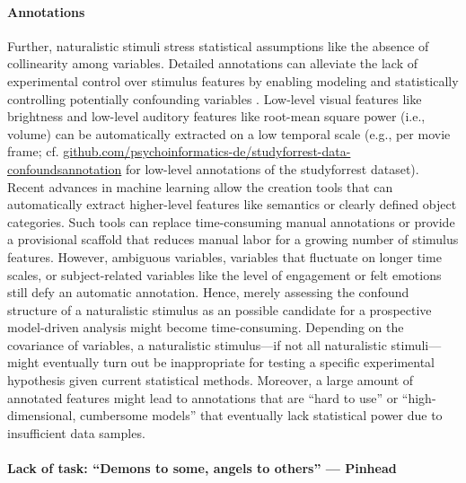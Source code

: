 \paragraph{Annotations}
%
Further, naturalistic stimuli stress statistical assumptions like the absence of
collinearity among variables.
%
Detailed annotations can alleviate the lack of experimental control over
stimulus features by enabling modeling and statistically controlling potentially
confounding variables \citep[e.g.,][]{deniz2019representation}.
%
Low-level visual features like brightness and
low-level auditory features like root-mean square power (i.e., volume) can be
automatically extracted on a low temporal scale (e.g., per movie frame; cf.
\href{https://github.com/psychoinformatics-de/studyforrest-data-confoundsannotation
}{\url{github.com/psychoinformatics-de/studyforrest-data-confoundsannotation}}
for low-level annotations of the studyforrest dataset).
%
Recent advances in machine learning allow the creation tools \citep[e.g., the
toolbox ``pliers'' that is implemented in the
\href{https://neuroscout.org/}{\url{neuroscout.org}}
platform;][]{mcnamara2017developing, delavega2022neuroscout} that can
automatically extract higher-level features like semantics or clearly defined
object categories.
%
Such tools can replace time-consuming manual annotations or provide a
provisional scaffold that reduces manual labor for a growing number of stimulus
features.
%
However, ambiguous variables, variables that fluctuate on longer time scales, or
subject-related variables like the level of engagement or felt emotions
\citep[cf., e.g.,][]{lettieri2019emotionotopy, saarimaki2021naturalistic} still
defy an automatic annotation.
%
Hence, merely assessing the confound structure of a naturalistic stimulus as an
possible candidate for a prospective model-driven analysis might become
time-consuming.
%
Depending on the covariance of variables, a naturalistic stimulus---if not all
naturalistic stimuli---might eventually turn out be inappropriate for testing a
specific experimental hypothesis given current statistical methods.
%
Moreover, a large amount of annotated features might lead to annotations that
are ``hard to use'' \citep[][p. 2]{richard2019fast} or ``high-dimensional,
cumbersome models'' \citep[][p. 2]{richard2019fast} that eventually lack
statistical power due to insufficient data samples.


\paragraph{Lack of task: ``Demons to some, angels to others'' --- Pinhead}

